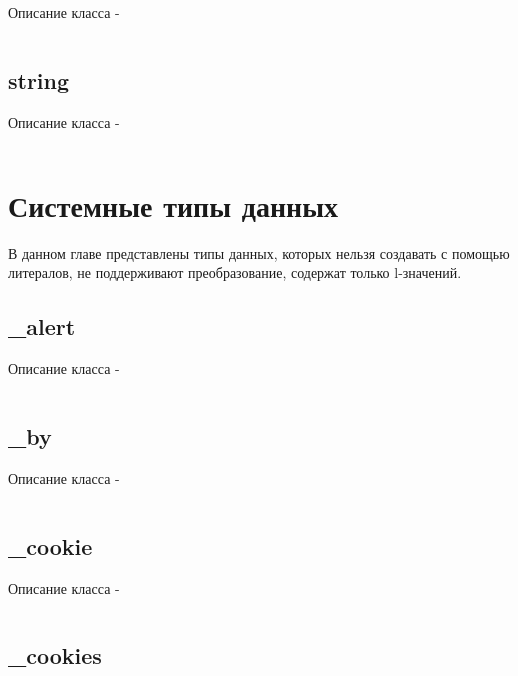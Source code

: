 \documentclass[a4paper, 14pt]{extarticle}
\begin{document}
Описание класса \set -
\begin{lstlisting}[numbers=none]

\end{lstlisting}

\subsection{{\color{lightblue} string}}

Описание класса \str -
\begin{lstlisting}[numbers=none]

\end{lstlisting}


\section{Системные типы данных}

В данном главе представлены типы данных, которых нельзя создавать с помощью литералов, не поддерживают преобразование, содержат только l-значений.

\subsection{{\color{orange} \_alert}}

Описание класса  -
\begin{lstlisting}[numbers=none]

\end{lstlisting}

\subsection{{\color{orange} \_by}}

Описание класса  -
\begin{lstlisting}[numbers=none]

\end{lstlisting}

\subsection{{\color{orange} \_cookie}}

Описание класса  -
\begin{lstlisting}[numbers=none]

\end{lstlisting}

\subsection{{\color{orange} \_cookies}}
\end{document}
